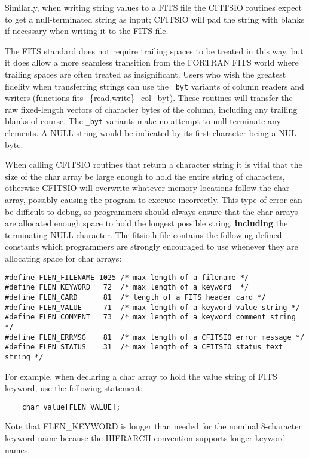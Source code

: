 \documentclass[11pt]{book}
\begin{document}
Similarly, when writing string values to a FITS file the
CFITSIO routines expect to get a null-terminated string as input;
CFITSIO will pad the string with blanks if necessary when writing it
to the FITS file.

The FITS standard does not require trailing spaces to be treated in
this way, but it does allow a more seamless transition from the
FORTRAN FITS world where trailing spaces are often treated as
insignificant.  Users who wish the greatest fidelity when transferring
strings can use the \verb+_byt+ variants of column readers and writers
(functions fits\_\{read,write\}\_col\_byt).  These routines will
transfer the raw fixed-length vectors of character bytes of the
column, including any trailing blanks of course. The \verb+_byt+
variants make no attempt to null-terminate any elements.  A NULL
string would be indicated by its first character being a NUL byte.

When calling CFITSIO routines that return a character string it is
vital that the size of the char array be large enough to hold the
entire string of characters, otherwise CFITSIO will overwrite whatever
memory locations follow the char array, possibly causing the program to
execute incorrectly.  This type of error can be difficult to debug, so
programmers should always ensure that the char arrays are allocated
enough space to hold the longest possible string, {\bf including} the
terminating NULL character.  The fitsio.h file contains the following
defined constants which programmers are strongly encouraged to use
whenever they are allocating space for char arrays:

\begin{verbatim}
#define FLEN_FILENAME 1025 /* max length of a filename */
#define FLEN_KEYWORD   72  /* max length of a keyword  */
#define FLEN_CARD      81  /* length of a FITS header card */
#define FLEN_VALUE     71  /* max length of a keyword value string */
#define FLEN_COMMENT   73  /* max length of a keyword comment string */
#define FLEN_ERRMSG    81  /* max length of a CFITSIO error message */
#define FLEN_STATUS    31  /* max length of a CFITSIO status text string */
\end{verbatim}
For example, when declaring a char array to hold the value string
of FITS keyword, use the following statement:

\begin{verbatim}
    char value[FLEN_VALUE];
\end{verbatim}
Note that FLEN\_KEYWORD is longer than needed for the nominal 8-character
keyword name because the HIERARCH convention supports longer keyword names.
\end{document}
